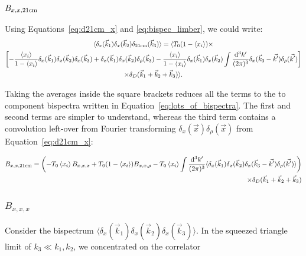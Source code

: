 \subsubsection{$B_{x,x,\rm 21cm}$}
\label{subsec:B_xx21}
Using Equations~\ref{eq:d21cm_x} and \ref{eq:bispec_limber}, we could write:
\begin{multline}
\langle \delta_x(\vec{k}_1) \delta_x(\vec{k}_2) \delta_{{\rm 21cm}}(\vec{k}_3) \rangle = 
\langle
T_0(1- \left\langle x_i \right\rangle ) \times \\
\left[
- \frac{\left\langle x_i \right\rangle}{1 - \left\langle x_i \right\rangle} \delta_x(\vec{k}_1) \delta_x(\vec{k}_2) \delta_x(\vec{k}_3) + \delta_x(\vec{k}_1) \delta_x(\vec{k}_2) \delta_{\rho}(\vec{k}_3) 
 - \frac{\left\langle x_i \right\rangle}{1 - \left\langle x_i \right\rangle} \delta_x(\vec{k}_1) \delta_x(\vec{k}_2) \int \frac{{\rm d^3}k'}{(2\pi)^3} \delta_x(\vec{k}_3 - \vec{k'})\delta_{\rho}(\vec{k'})
\right] \\
\times \delta_D(\vec{k}_1+\vec{k}_2+\vec{k}_3) 
\rangle .
\label{eq:B_xx21}
\end{multline}

Taking the averages inside the square brackets reduces all the terms to the to component bispectra written in Equation~\ref{eq:lots_of_bispectra}. The first and second terms are simpler to understand, whereas the third term contains a convolution left-over from Fourier transforming $\delta_x(\vec{x})\delta_{\rho}(\vec{x})$ from Equation~\ref{eq:d21cm_x}:

\begin{equation}
\begin{split}
B_{x,x,{\rm 21cm}} = \left( -T_0 \left\langle x_i \right\rangle B_{x,x,x} + T_0(1-\left\langle x_i \right\rangle) B_{x,x,\rho} - T_0 \left\langle x_i \right\rangle \int \frac{{\rm d^3}k'}{(2\pi)^3}
\langle \delta_x(\vec{k}_1) \delta_x(\vec{k}_2) \delta_x(\vec{k}_3 - \vec{k'})\delta_{\rho}(\vec{k'}) \rangle \right)\\
\times \delta_D(\vec{k}_1+\vec{k}_2+\vec{k}_3)
\end{split}
\end{equation}

\subsubsection*{$B_{x,x,x}$}
\label{subsubsec:Bxxx}
Consider the bispectrum $\langle\delta_x(\vec{k}_1)\delta_x(\vec{k}_2)\delta_x(\vec{k}_3)\rangle$. In the squeezed triangle limit of $k_3 \ll k_1, k_2$, we concentrated on the correlator

